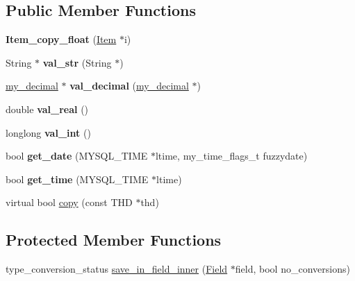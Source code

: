 \subsection*{Public Member Functions}
\begin{DoxyCompactItemize}
\item 
\mbox{\label{classItem__copy__float_af33d3a479ab90881073ebb6cd26173d8}} 
{\bfseries Item\+\_\+copy\+\_\+float} (\mbox{\hyperlink{classItem}{Item}} $\ast$i)
\item 
\mbox{\label{classItem__copy__float_a852f05208725d19e397a9b292efd6204}} 
String $\ast$ {\bfseries val\+\_\+str} (String $\ast$)
\item 
\mbox{\label{classItem__copy__float_a6ddb98ccd3d3a00d77aa9fa570878cb0}} 
\mbox{\hyperlink{classmy__decimal}{my\+\_\+decimal}} $\ast$ {\bfseries val\+\_\+decimal} (\mbox{\hyperlink{classmy__decimal}{my\+\_\+decimal}} $\ast$)
\item 
\mbox{\label{classItem__copy__float_a20ee58a96b65d234968d79e2d909cbf7}} 
double {\bfseries val\+\_\+real} ()
\item 
\mbox{\label{classItem__copy__float_ac216d880e77b3e15b9b7dc04ad3d4d5e}} 
longlong {\bfseries val\+\_\+int} ()
\item 
\mbox{\label{classItem__copy__float_ad20dd945a1952b32d29cea4f8af6e246}} 
bool {\bfseries get\+\_\+date} (M\+Y\+S\+Q\+L\+\_\+\+T\+I\+ME $\ast$ltime, my\+\_\+time\+\_\+flags\+\_\+t fuzzydate)
\item 
\mbox{\label{classItem__copy__float_a695b8b50ef2ab64da4f986ee7d928fc9}} 
bool {\bfseries get\+\_\+time} (M\+Y\+S\+Q\+L\+\_\+\+T\+I\+ME $\ast$ltime)
\item 
virtual bool \mbox{\hyperlink{classItem__copy__float_a33ef4acb20a062adcc037c1473f79bb0}{copy}} (const T\+HD $\ast$thd)
\end{DoxyCompactItemize}
\subsection*{Protected Member Functions}
\begin{DoxyCompactItemize}
\item 
type\+\_\+conversion\+\_\+status \mbox{\hyperlink{classItem__copy__float_a02adac943fb28891430337f1b64a7595}{save\+\_\+in\+\_\+field\+\_\+inner}} (\mbox{\hyperlink{classField}{Field}} $\ast$field, bool no\+\_\+conversions)
\end{DoxyCompactItemize}

